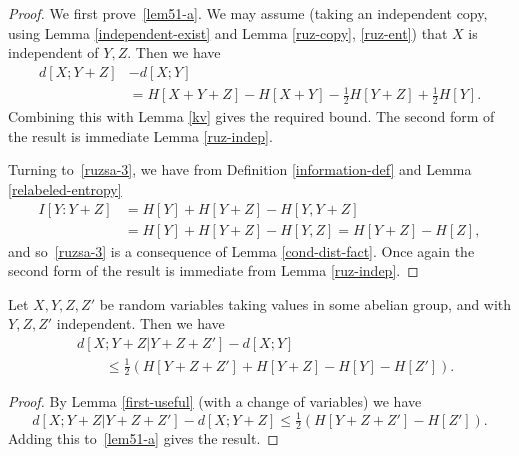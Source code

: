   \begin{proof}
  We first prove~\eqref{lem51-a}. We may assume (taking an independent copy, using Lemma \ref{independent-exist} and Lemma \ref{ruz-copy}, \ref{ruz-ent}) that $X$ is independent of $Y, Z$. Then we have
  \begin{align*}  d[X;Y+Z] & - d[X;Y] \\ & = H[X + Y + Z] - H[X+Y] - \tfrac{1}{2}H[Y + Z] + \tfrac{1}{2} H[Y].\end{align*}
  Combining this with Lemma \ref{kv} gives the required bound. The second form of the result is immediate Lemma \ref{ruz-indep}.

  Turning to~\eqref{ruzsa-3}, we have from Definition \ref{information-def} and Lemma \ref{relabeled-entropy}
  \begin{align*} I[Y : Y+Z] & = H[Y] + H[Y + Z] - H[Y, Y + Z] \\ & = H[Y] + H[Y + Z] - H[Y, Z]  = H[Y + Z] - H[Z],\end{align*}
  and so~\eqref{ruzsa-3} is a consequence of Lemma \ref{cond-dist-fact}. Once again the second form of the result is immediate from Lemma \ref{ruz-indep}.
\end{proof}

\begin{lemma}\label{second-useful}
  Let $X, Y, Z, Z'$ be random variables taking values in some abelian group, and with $Y, Z, Z'$ independent. Then we have
  \begin{align}\nonumber
  & d[X;Y + Z | Y + Z + Z'] - d[X;Y] \\ & \qquad \leq \tfrac{1}{2} ( H[Y + Z + Z'] + H[Y + Z] - H[Y] - H[Z']).\label{7111}
  \end{align}
  \end{lemma}

  \begin{proof}
  By Lemma \ref{first-useful} (with a change of variables) we have
  \[ d[X; Y + Z | Y + Z + Z'] - d[X; Y + Z] \leq \tfrac{1}{2}( H[Y + Z + Z'] - H[Z']).\]
  Adding this to~\eqref{lem51-a} gives the result.
  \end{proof}
